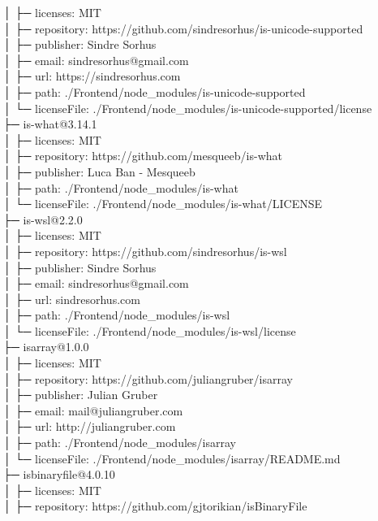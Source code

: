 │  ├─ licenses: MIT\\
│  ├─ repository: https://github.com/sindresorhus/is-unicode-supported\\
│  ├─ publisher: Sindre Sorhus\\
│  ├─ email: sindresorhus@gmail.com\\
│  ├─ url: https://sindresorhus.com\\
│  ├─ path: ./Frontend/node\_modules/is-unicode-supported\\
│  └─ licenseFile: ./Frontend/node\_modules/is-unicode-supported/license\\
├─ is-what@3.14.1\\
│  ├─ licenses: MIT\\
│  ├─ repository: https://github.com/mesqueeb/is-what\\
│  ├─ publisher: Luca Ban - Mesqueeb\\
│  ├─ path: ./Frontend/node\_modules/is-what\\
│  └─ licenseFile: ./Frontend/node\_modules/is-what/LICENSE\\
├─ is-wsl@2.2.0\\
│  ├─ licenses: MIT\\
│  ├─ repository: https://github.com/sindresorhus/is-wsl\\
│  ├─ publisher: Sindre Sorhus\\
│  ├─ email: sindresorhus@gmail.com\\
│  ├─ url: sindresorhus.com\\
│  ├─ path: ./Frontend/node\_modules/is-wsl\\
│  └─ licenseFile: ./Frontend/node\_modules/is-wsl/license\\
├─ isarray@1.0.0\\
│  ├─ licenses: MIT\\
│  ├─ repository: https://github.com/juliangruber/isarray\\
│  ├─ publisher: Julian Gruber\\
│  ├─ email: mail@juliangruber.com\\
│  ├─ url: http://juliangruber.com\\
│  ├─ path: ./Frontend/node\_modules/isarray\\
│  └─ licenseFile: ./Frontend/node\_modules/isarray/README.md\\
├─ isbinaryfile@4.0.10\\
│  ├─ licenses: MIT\\
│  ├─ repository: https://github.com/gjtorikian/isBinaryFile\\
